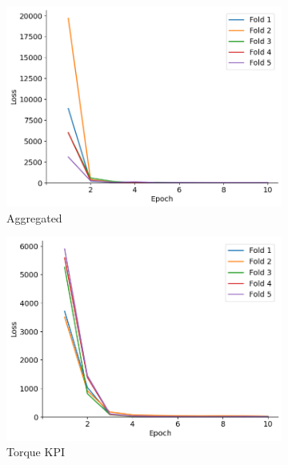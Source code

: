 \documentclass{report} %
\begin{document}
\begin{figure}[H]
    \centering
    \begin{subfigure}{0.32\textwidth}
        \centering
        \includegraphics[width=\textwidth]{./ReportImages/val_loss.png}
        \caption{\centering Aggregated}
        \label{fig:Aggregated Validation Loss}
    \end{subfigure}\hfill
    \begin{subfigure}{0.32\textwidth}
        \centering
        \includegraphics[width=\textwidth]{./ReportImages/val_loss_y1.png}
        \caption{\centering Torque \ac{KPI}}
        \label{fig:Validation Loss for Torque Curve}
    \end{subfigure}\hfill
    \begin{subfigure}{0.32\textwidth}

\end{subfigure}
\end{figure}
\end{document}
